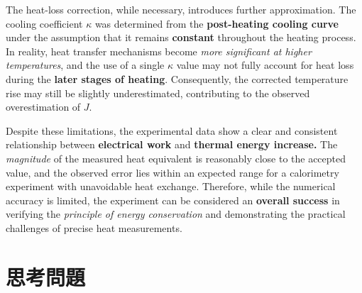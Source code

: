 \documentclass[12pt]{article}
\begin{document}
\vspace{0.3cm}
The heat-loss correction, while necessary, introduces further approximation. The cooling coefficient $\kappa$ was determined from the\textbf{ post-heating cooling curve} under the assumption that it remains \textbf{constant} throughout the heating process. In reality, heat transfer mechanisms become \textit{more significant at higher temperatures}, and the use of a single $\kappa$ value may not fully account for heat loss during the \textbf{later stages of heating}. Consequently, the corrected temperature rise may still be slightly underestimated, contributing to the observed overestimation of $J$. 

\vspace{0.3cm}
Despite these limitations, the experimental data show a clear and consistent relationship between \textbf{electrical work} and\textbf{ thermal energy increase.} The \textit{magnitude} of the measured heat equivalent is reasonably close to the accepted value, and the observed error lies within an expected range for a calorimetry experiment with unavoidable heat exchange. Therefore, while the numerical accuracy is limited, the experiment can be considered an \textbf{overall success} in verifying the\textit{ principle of energy conservation} and demonstrating the practical challenges of precise heat measurements.

 
\newpagea
\section{\textbf{思考問題}}
\end{document}
